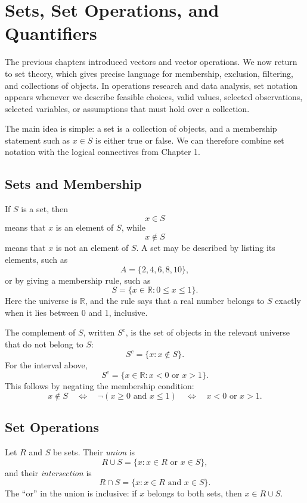 \chapter{Sets, Set Operations, and Quantifiers}
\label{mf:ch04-sets-set-operations-quantifiers}

The previous chapters introduced vectors and vector operations. We now return to set theory, which gives precise language for membership, exclusion, filtering, and collections of objects. In operations research and data analysis, set notation appears whenever we describe feasible choices, valid values, selected observations, selected variables, or assumptions that must hold over a collection.

The main idea is simple: a set is a collection of objects, and a membership statement such as \(x\in S\) is either true or false. We can therefore combine set notation with the logical connectives from Chapter 1.

\section{Sets and Membership}
\label{mf:set-membership}

If \(S\) is a set, then
\[
    x\in S
\]
means that \(x\) is an element of \(S\), while
\[
    x\notin S
\]
means that \(x\) is not an element of \(S\). A set may be described by listing its elements, such as
\[
    A=\{2,4,6,8,10\},
\]
or by giving a membership rule, such as
\[
    S=\{x\in\mathbb{R}:0\leq x\leq 1\}.
\]
Here the universe is \(\mathbb{R}\), and the rule says that a real number belongs to \(S\) exactly when it lies between 0 and 1, inclusive.

The complement of \(S\), written \(S^c\), is the set of objects in the relevant universe that do not belong to \(S\):
\[
    S^c=\{x:x\notin S\}.
\]
For the interval above,
\[
    S^c=\{x\in\mathbb{R}:x<0\text{ or }x>1\}.
\]
This follows by negating the membership condition:
\[
    x\notin S
    \quad\Longleftrightarrow\quad
    \neg(x\geq 0\text{ and }x\leq 1)
    \quad\Longleftrightarrow\quad
    x<0\text{ or }x>1.
\]

\section{Set Operations}
\label{mf:set-operations}
\label{mf:set-union-intersection}
\label{mf:set-complement}

Let \(R\) and \(S\) be sets. Their \emph{union} is
\[
    R\cup S=\{x:x\in R\text{ or }x\in S\},
\]
and their \emph{intersection} is
\[
    R\cap S=\{x:x\in R\text{ and }x\in S\}.
\]
The ``or'' in the union is inclusive: if \(x\) belongs to both sets, then \(x\in R\cup S\).


